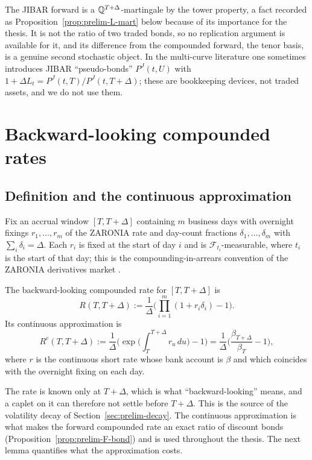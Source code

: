 \documentclass[../../../main.tex]{subfiles}
\begin{document}
The JIBAR forward is a $\mathbb{Q}^{T+\Delta}$-martingale by the tower property, a fact recorded as Proposition~\ref{prop:prelim-L-mart} below because of its importance for the thesis. It is not the ratio of two traded bonds, so no replication argument is available for it, and its difference from the compounded forward, the tenor basis, is a genuine second stochastic object. In the multi-curve literature one sometimes introduces JIBAR ``pseudo-bonds'' $P^J(t,U)$ with $1+\Delta L_t=P^J(t,T)/P^J(t,T+\Delta)$; these are bookkeeping devices, not traded assets, and we do not use them.

\section{Backward-looking compounded rates}\label{sec:prelim-compounded}

\subsection{Definition and the continuous approximation}

Fix an accrual window $[T,T+\Delta]$ containing $m$ business days with overnight fixings $r_1,\dots,r_m$ of the ZARONIA rate and day-count fractions $\delta_1,\dots,\delta_m$ with $\sum_i\delta_i=\Delta$. Each $r_i$ is fixed at the start of day $i$ and is $\mathcal F_{t_i}$-measurable, where $t_i$ is the start of that day; this is the compounding-in-arrears convention of the ZARONIA derivatives market \cite{sarb2024conv}.

\begin{definition}\label{def:prelim-R}
The backward-looking compounded rate for $[T,T+\Delta]$ is
\begin{equation}\label{eq:prelim-R-daily}
R(T,T+\Delta):=\frac1\Delta\Big(\prod_{i=1}^{m}(1+r_i\delta_i)-1\Big).
\end{equation}
Its continuous approximation is
\begin{equation}\label{eq:prelim-R-cont}
R^{c}(T,T+\Delta):=\frac1\Delta\Big(\exp\Big(\int_T^{T+\Delta}r_u\,du\Big)-1\Big)=\frac1\Delta\Big(\frac{\beta_{T+\Delta}}{\beta_T}-1\Big),
\end{equation}
where $r$ is the continuous short rate whose bank account is $\beta$ and which coincides with the overnight fixing on each day.
\end{definition}

The rate is known only at $T+\Delta$, which is what ``backward-looking'' means, and a caplet on it can therefore not settle before $T+\Delta$. This is the source of the volatility decay of Section~\ref{sec:prelim-decay}. The continuous approximation is what makes the forward compounded rate an exact ratio of discount bonds (Proposition~\ref{prop:prelim-F-bond}) and is used throughout the thesis. The next lemma quantifies what the approximation costs.
\end{document}
